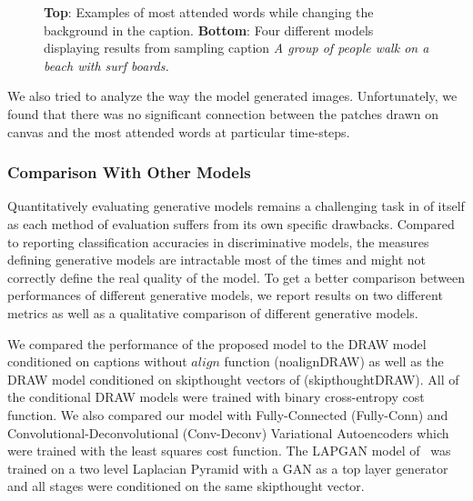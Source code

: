 \documentclass{article} %
\begin{document}
\begin{figure}[!t]
\begin{center}
%
\quad
%
\quad
%
\end{center}
\caption{ \textbf{Top}: Examples of most attended words while changing the background in the caption. 
\textbf{Bottom}: Four different models displaying results from sampling caption \textit{A group of people walk on a beach with surf boards.}}
\label{fig:diffmodels}
\vspace{-0.1in}
\end{figure}

We also tried to analyze the way the model generated images. Unfortunately, we found that there was no significant connection between the patches drawn on canvas and the most attended words at particular time-steps.

\subsubsection{Comparison With Other Models}
\vspace{-0.05in}
Quantitatively evaluating generative models remains a challenging task in of itself as each method of evaluation suffers from its own specific drawbacks. Compared to reporting classification accuracies in discriminative models, the measures defining generative models are intractable most of the times and might not correctly define the real quality of the model. To get a better comparison between performances of different generative models, we report results on two different metrics as well as a qualitative comparison of different generative models.

We compared the performance of the proposed model to the DRAW model conditioned on captions without $align$ function (noalignDRAW) as well as the DRAW model conditioned on skipthought vectors of \cite{kiros_skipthought} (skipthoughtDRAW). All of the conditional DRAW models were trained with binary cross-entropy cost function. We also compared our model with Fully-Connected (Fully-Conn) and Convolutional-Deconvolutional (Conv-Deconv) Variational Autoencoders which were trained with the least squares cost function. The LAPGAN model of~\cite{denton_lapgan} was trained on a two level Laplacian Pyramid with a GAN as a top layer generator and all stages were conditioned on the same skipthought vector.
\end{document}
